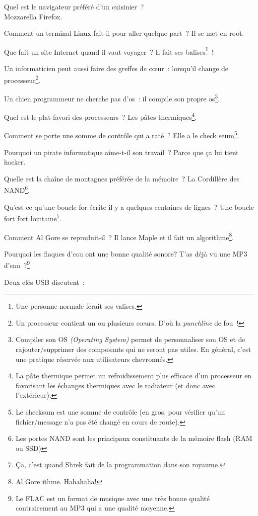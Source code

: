 \documentclass[10pt,a5paper,fullpage]{book}
\begin{document}
\begin{enumerate}
{		\item Quel est le navigateur préféré d'un cuisinier~? \\Mozzarella Firefox.
		\item Comment un terminal Linux fait-il pour aller quelque part~? Il se met en root.
		\item Que fait un site Internet quand il vaut voyager~? Il fait ses balises\footnote{Une personne normale ferait ses valises.}~!
		\item Un informaticien peut aussi faire des greffes de cœur~: lorsqu’il change de processeur\footnote{Un processeur contient un ou plusieurs cœurs. D’où la \textit{punchline} de fou~!}.
		\item Un chien programmeur ne cherche pas d’os~: il compile son propre os\footnote{Compiler son OS \textit{(Operating System)} permet de personnaliser son OS et de rajouter/supprimer des composants qui ne seront pas utiles. En général, c'est une pratique réservée aux utilisateurs chevronnés.}.
		\item Quel est le plat favori des processeurs~? Les pâtes thermiques\footnote{La pâte thermique permet un refroidissement plus efficace d’un processeur en favorisant les échanges thermiques avec le radiateur (et donc avec l’extérieur).}.
		\item Comment se porte une somme de contrôle qui a raté~? Elle a le check seum\footnote{Le checksum est une somme de contrôle (en gros, pour vérifier qu’un fichier/message n’a pas été changé en cours de route).}.
		\item Pourquoi un pirate informatique aime-t-il son travail~? Parce que ça lui tient hacker.
		\item Quelle est la chaîne de montagnes préférée de la mémoire~? La Cordillère des NAND\footnote{Les portes NAND sont les principaux constituants de la mémoire flash (RAM ou SSD)}.
		\item Qu’est-ce qu’une boucle for écrite il y a quelques centaines de lignes~? Une boucle fort fort lointaine\footnote{Ça, c’est quand Shrek fait de la programmation dans son royaume.}.
		\item Comment Al Gore se reproduit-il~? Il lance Maple et il fait un algorithme\footnote{Al Gore ithme. Hahahaha!}.
		\item Pourquoi les flaques d’eau ont une bonne qualité sonore? T’as déjà vu une MP3 d’eau~?\footnote{Le FLAC est un format de musique avec une très bonne qualité contrairement au MP3 qui a une qualité moyenne.}
		\item Deux clés USB discutent~:
}
\end{enumerate}
\end{document}
